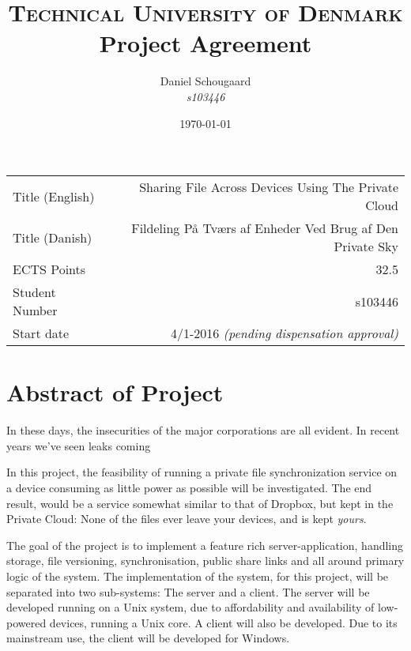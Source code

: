 \documentclass[a4paper,10pt]{article}
\title{	
\textsc{Technical University of Denmark} \\ [25pt] 
\huge Project Agreement
}
\author{Daniel Schougaard \\ \textit{s103446}}
\date{\normalsize\today}
\begin{document}
\maketitle 


\begin{tabular}{ | l | r | }
	Title (English)		&	Sharing File Across Devices Using The Private Cloud					\\
	Title (Danish)		&	Fildeling På Tværs af Enheder Ved Brug af Den Private Sky			\\
	ECTS Points			&	32.5																\\
	Student Number		&	s103446																\\
	Start date 			&	4/1-2016 \textit{(pending dispensation approval)}					\\
\end{tabular}



\section{Abstract of Project}
	In these days, the insecurities of the major corporations are all evident. In recent years we've seen leaks coming 


	In this project, the feasibility of running a private file synchronization service on a device consuming as little power as possible will be investigated. The end result, would be a service somewhat similar to that of Dropbox, but kept in the Private Cloud: None of the files ever leave your devices, and is kept \emph{yours}.



	The goal of the project is to implement a feature rich server-application, handling storage, file versioning, synchronisation, public share links and all around primary logic of the system. The implementation of the system, for this project, will be separated into two sub-systems: The server and a client. The server will be developed running on a Unix system, due to affordability and availability of low-powered devices, running a Unix core. A client will also be developed. Due to its mainstream use, the client will be developed for Windows.
\end{document}
